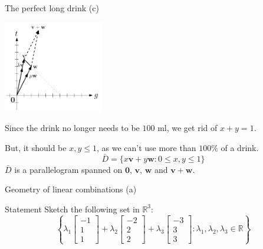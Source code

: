 \documentclass[10pt]{beamer}
\begin{document}
\begin{frame}{The perfect long drink (c)}

    \begin{center}
        \includegraphics[height=4cm]{../img/png/2.c}
    \end{center}

    Since the drink no longer needs to be $100$ ml, we get rid of $x+y=1$.

    But, it should be $x, y \leq 1$, as we can't use more than $100\%$ of a drink.
    $$
    \bar D = \{x \mathbf v + y \mathbf w : 0 \leq x, y \leq 1\}
    $$
    $\bar D$ is a parallelogram spanned on $\mathbf 0$, $\mathbf v$, $\mathbf w$ and $\mathbf v + \mathbf w$.
\end{frame}

\begin{frame}{Geometry of linear combinations (a)}
    \begin{block}{Statement}
        Sketch the following set in $\mathbb R^3$:
        $$\left\{\lambda_1 \begin{bmatrix}-1 \\ 1 \\ 1\end{bmatrix} + \lambda_2 \begin{bmatrix}-2 \\ 2 \\ 2\end{bmatrix} + \lambda_3 \begin{bmatrix}-3 \\ 3 \\ 3\end{bmatrix} : \lambda_1, \lambda_2, \lambda_3 \in \mathbb R\right\}$$
    \end{block}
\end{frame}
\end{document}
